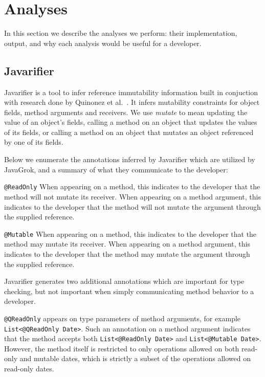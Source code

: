 \section{Analyses}

In this section we describe the analyses we perform: their implementation,
output, and why each analysis would be useful for a developer.

\subsection{Javarifier}
\label{sec:Javarifier}

Javarifier is a tool to infer reference immutability information built in
conjuction with research done by Quinonez et al.~\cite{Javarifier}. It infers
mutability constraints for object fields, method arguments and receivers.  We
use \textit{mutate} to mean updating the value of an object's fields, calling a
method on an object that updates the values of its fields, or calling a method
on an object that mutates an object referenced by one of its fields.

Below we enumerate the annotations inferred by Javarifier which are utilized by
JavaGrok, and a summary of what they communicate to the developer:

\texttt{@ReadOnly} When appearing on a method, this indicates to the developer
that the method will not mutate its receiver. When appearing on a method
argument, this indicates to the developer that the method will not mutate the
argument through the supplied reference.

\texttt{@Mutable} When appearing on a method, this indicates to the developer
that the method may mutate its receiver. When appearing on a method argument,
this indicates to the developer that the method may mutate the argument through
the supplied reference.

Javarifier generates two additional annotations which are important for type
checking, but not important when simply communicating method behavior to a
developer.

\texttt{@QReadOnly} appears on type parameters of method arguments, for example
\texttt{List<@QReadOnly Date>}. Such an annotation on a method argument
indicates that the method accepts both \texttt{List<@ReadOnly Date>} and
\texttt{List<@Mutable Date>}. However, the method itself is restricted to only
operations allowed on both read-only and mutable dates, which is strictly a
subset of the operations allowed on read-only dates.

